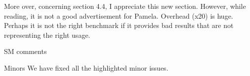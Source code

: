 \documentclass[10pt]{article}
\begin{document}
\begin{response}{More over, concerning section 4.4, I appreciate this new section. However, while reading, it is not a good advertisement for Pamela. Overhead (x20) is huge. Perhaps it is not the right benchmark if it provides bad results that are not representing the right usage.}

SM comments

\end{response}

\begin{response}{Minors}
We have fixed all the highlighted minor issues.
\end{response}
\end{document}
